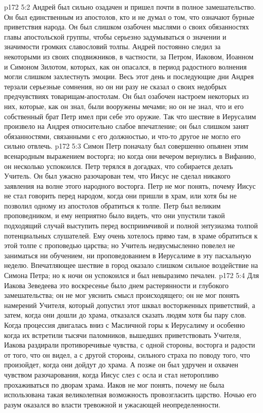 \vs p172 5:2 Андрей был сильно озадачен и пришел почти в полное замешательство. Он был единственным из апостолов, кто и не думал о том, что означают бурные приветствия народа. Он был слишком озабочен мыслями о своих обязанностях главы апостольской группы, чтобы серьезно задумываться о значении и значимости громких славословий толпы. Андрей постоянно следил за некоторыми из своих сподвижников, в частности, за Петром, Иаковом, Иоанном и Симоном Зилотом, которых, как он опасался, в период радостного волнения могли слишком захлестнуть эмоции. Весь этот день и последующие дни Андрея терзали серьезные сомнения, но он ни разу не сказал о своих недобрых предчувствиях товарищам\hyp{}апостолам. Он был озабочен настроем некоторых из них, которые, как он знал, были вооружены мечами; но он не знал, что и его собственный брат Петр имел при себе это оружие. Так что шествие в Иерусалим произвело на Андрея относительно слабое впечатление; он был слишком занят обязанностями, связанными с его должностью, и что\hyp{}то другое не могло его сильно отвлечь.
\vs p172 5:3 Симон Петр поначалу был совершенно опьянен этим всенародным выражением восторга; но когда они вечером вернулись в Вифанию, он несколько успокоился. Петр терялся в догадках, что собирается делать Учитель. Он был ужасно разочарован тем, что Иисус не сделал никакого заявления на волне этого народного восторга. Петр не мог понять, почему Иисус не стал говорить перед народом, когда они пришли в храм, или хотя бы не позволил одному из апостолов обратиться к толпе. Петр был великим проповедником, и ему неприятно было видеть, что они упустили такой подходящий случай выступить перед восприимчивой и полной энтузиазма толпой потенциальных слушателей. Ему очень хотелось прямо там, в храме обратиться к этой толпе с проповедью царства; но Учитель недвусмысленно повелел не заниматься ни обучением, ни проповедованием в Иерусалиме в эту пасхальную неделю. Впечатляющее шествие в город оказало слишком сильное воздействие на Симона Петра; но к ночи он успокоился и был невыразимо печален.
\vs p172 5:4 Для Иакова Зеведеева это воскресенье было днем растерянности и глубокого замешательства; он не мог уяснить смысл происходящего; он не мог понять намерений Учителя, который допустил этот шквал восторженных приветствий, а затем, когда они дошли до храма, отказался сказать людям хотя бы пару слов. Когда процессия двигалась вниз с Масличной горы к Иерусалиму и особенно когда их встретили тысячи паломников, вышедших приветствовать Учителя, Иакова раздирали противоречивые чувства, с одной стороны, восторга и радости от того, что он видел, а с другой стороны, сильного страха по поводу того, что произойдет, когда они дойдут до храма. А позже он был удручен и охвачен чувством разочарования, когда Иисус слез с осла и стал неторопливо прохаживаться по дворам храма. Иаков не мог понять, почему не была использована такая великолепная возможность провозгласить царство. Ночью его разум оказался во власти тревожной и ужасающей неопределенности.
